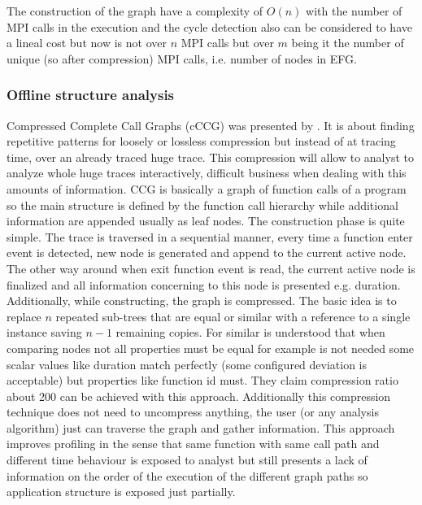 The construction of the graph have a complexity of $O(n)$ with the number of MPI
calls in the execution and the cycle detection also can be considered to have a
lineal cost but now is not over $n$ MPI calls but over $m$ being it the number
of unique (so after compression) MPI calls, i.e. number of nodes in EFG. 


\subsubsection{Offline structure analysis}

Compressed Complete Call Graphs (cCCG) was
presented by \cite{knupfer2005construction}. It is about finding repetitive 
patterns for loosely or lossless compression but instead of at tracing time, 
over an already traced huge trace. 
This compression will allow to analyst to analyze whole huge traces 
interactively, difficult business when dealing with this amounts of information. 
CCG is basically a graph of function calls of a program so the main structure is
defined by the function call hierarchy while additional information are appended
usually as leaf nodes. The construction phase is quite simple. The trace is
traversed in a sequential manner, every time a function enter event is detected,
new node is generated and append to the current active node. The
other way around when exit function event is read, the current active node is
finalized and all information concerning to this node is presented e.g.
duration. Additionally, while constructing, the graph is compressed. The basic 
idea is to replace $n$ repeated sub-trees that are equal or similar with a 
reference to a single instance saving $n-1$ remaining copies. For similar is
understood that when comparing nodes not all properties must be equal for
example is not needed some scalar values like duration match perfectly (some
configured deviation is acceptable) but properties like function id must. They
claim compression ratio about 200 can be achieved with this approach.
Additionally this compression technique does not need to uncompress anything, the
user (or any analysis algorithm) just can traverse the graph and gather
information. This approach improves profiling in the sense that same function 
with same call
path and different time behaviour is exposed to analyst but still presents a lack 
of information on the order of the execution of the different graph paths so
application structure is exposed just partially. 


